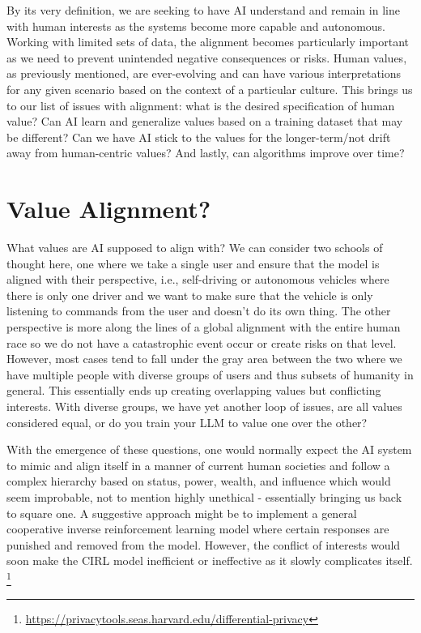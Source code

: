 \documentclass[
]{book}
\begin{document}
By its very definition, we are seeking to have AI understand and remain in line with human interests as the systems become more capable and autonomous. Working with limited sets of data, the alignment becomes particularly important as we need to prevent unintended negative consequences or risks. Human values, as previously mentioned, are ever-evolving and can have various interpretations for any given scenario based on the context of a particular culture. This brings us to our list of issues with alignment: what is the desired specification of human value? Can AI learn and generalize values based on a training dataset that may be different? Can we have AI stick to the values for the longer-term/not drift away from human-centric values? And lastly, can algorithms improve over time?

\hypertarget{value-alignment}{%
\section{Value Alignment?}\label{value-alignment}}

What values are AI supposed to align with? We can consider two schools of thought here, one where we take a single user and ensure that the model is aligned with their perspective, i.e., self-driving or autonomous vehicles where there is only one driver and we want to make sure that the vehicle is only listening to commands from the user and doesn't do its own thing. The other perspective is more along the lines of a global alignment with the entire human race so we do not have a catastrophic event occur or create risks on that level. However, most cases tend to fall under the gray area between the two where we have multiple people with diverse groups of users and thus subsets of humanity in general. This essentially ends up creating overlapping values but conflicting interests. With diverse groups, we have yet another loop of issues, are all values considered equal, or do you train your LLM to value one over the other?

With the emergence of these questions, one would normally expect the AI system to mimic and align itself in a manner of current human societies and follow a complex hierarchy based on status, power, wealth, and influence which would seem improbable, not to mention highly unethical - essentially bringing us back to square one. A suggestive approach might be to implement a general cooperative inverse reinforcement learning model where certain responses are punished and removed from the model. However, the conflict of interests would soon make the CIRL model inefficient or ineffective as it slowly complicates itself. \footnote{\url{https://privacytools.seas.harvard.edu/differential-privacy}}
\end{document}

